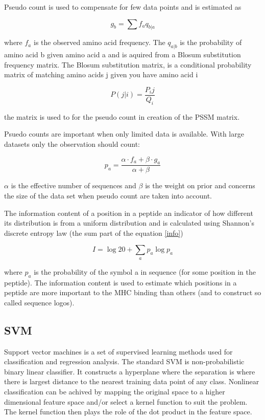 Pseudo count is used to compensate for few data points and is estimated as

\begin{equation}
g_b = \sum{f_a}{q_{b|a}}
\end{equation}

where $f_a$ is the observed amino acid frequency. The $q_{a|b}$ is the probability of amino acid b given amino acid a and is aquired from a Blosum substitution frequency matrix.
The Blosum substitution matrix, is a
conditional probability matrix of matching amino
acids j given you have amino acid i

\begin{equation}
P(j|i) = \frac{P_ij}{Q_i}
\end{equation}

the matrix is used to for the pseudo count in creation of the PSSM matrix. 

Psuedo counts are important when only limited data is available. With large datasets only the observation should count:

\begin{equation}
p_a = \frac{\alpha \cdot f_a + \beta \cdot g_a}{\alpha + \beta}
\end{equation}

$\alpha$ is the effective number of sequences and $\beta$ is the weight on prior and concerns the size of the data set when pseudo count are taken into account.

The information content of a position in a peptide an indicator of how different its distribution is from a uniform distribution and is calculated using Shannon's discrete entropy law (the sum part of the equation \ref{info})

\begin{equation}
\label{info}
I = \log{ 20 } + \sum_{a}{ p_{a}\log{p_{a}} }
\end{equation}

where $p_a$ is the probability of the symbol a in sequence (for some position in the peptide). The information content is used to estimate which positions in a peptide are more important to the MHC binding than others 
(and to construct so called sequence logos).

\subsection*{SVM}
Support vector machines is a set of supervised learning methods used for classification and regression analysis. 
The standard SVM is non-probabilistic binary linear classifier. 
It constructs a hyperplane where the separation is where there is largest distance to the nearest training data point of any class. 
Nonlinear classification can be achived by  mapping the original space to a higher dimensional feature space and/or select a kernel function to suit the problem. 
The kernel function then plays the role of the dot product in the feature space.

